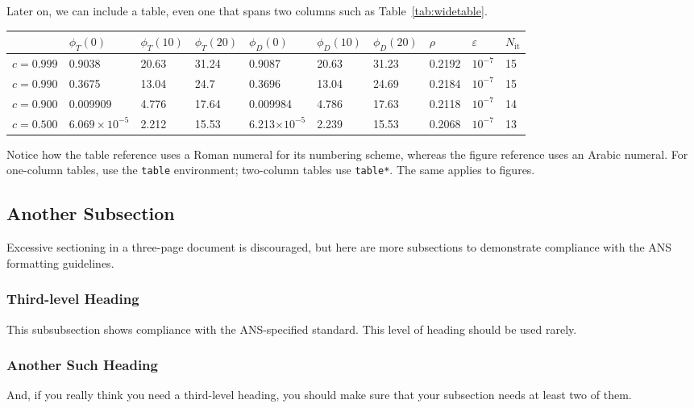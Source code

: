 \documentclass{anstrans}
\begin{document}
Later on, we can include a table, even one that spans two columns such as
Table~\ref{tab:widetable}.
\begin{table*}[htb]
  \centering
\begin{tabular}{llllllllll}\toprule
      & $\phi_T(0)$      & $\phi_T(10)$      & $\phi_T(20)$      &
      $\phi_D(0)$      & $\phi_D(10)$      & $\phi_D(20)$      & $\rho$      &
      $\varepsilon$      & $N_\text{it}$
\\ \midrule
$c=0.999$  & 0.9038 & 20.63 & 31.24 & 0.9087 & 20.63 & 31.23 & 0.2192 & $10^{-7}$ & 15
\\
$c=0.990$  & 0.3675 & 13.04 & 24.7 & 0.3696 & 13.04 & 24.69 & 0.2184 & $10^{-7}$ & 15
\\
$c=0.900$  & 0.009909 & 4.776 & 17.64 & 0.009984 & 4.786 & 17.63 & 0.2118 & $10^{-7}$ & 14
\\
$c=0.500$  & $6.069\times 10^{-5}$ & 2.212 & 15.53 & 6.213$\times 10^{-5}$ & 2.239 & 15.53 & 0.2068 & $10^{-7}$ & 13
\\
\bottomrule
\end{tabular}
  \caption{This is an example of a really wide table which might not normally
  fit in the document.}
  \label{tab:widetable}
\end{table*}
Notice how the table reference uses a Roman numeral
for its numbering scheme, whereas the figure reference uses an Arabic numeral.
For one-column tables, use the \verb|table| environment; two-column tables use
\verb|table*|. The same applies to figures.

\subsection{Another Subsection}
Excessive sectioning in a three-page document is discouraged, but here are more
subsections to demonstrate compliance with the ANS formatting guidelines.

\subsubsection{Third-level Heading}
This subsubsection shows compliance with the ANS-specified standard. This level
of heading should be used rarely.

\subsubsection{Another Such Heading}
And, if you really think you need a third-level heading, you should make sure
that your subsection needs at least two of them.
\end{document}
